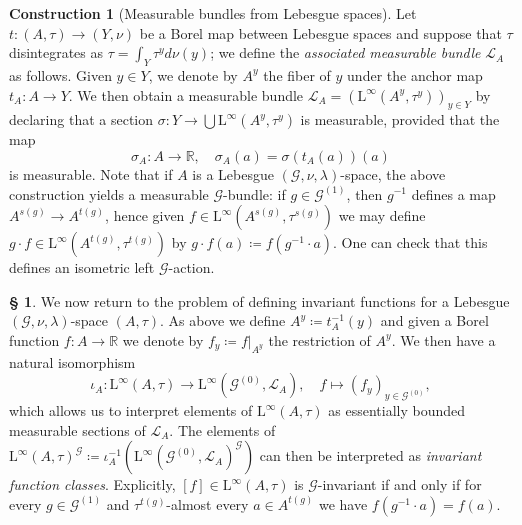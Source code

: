 \documentclass[11pt, oneside]{amsart}
\theoremstyle{definition}
\newtheorem{con}[lemma]{Construction}
\newtheorem{no}[lemma]{\S}
\theoremstyle{remark}
\theoremstyle{TheoremNum}
\newcommand{\Linf}{\mathrm{L}^{\infty}}
\newcommand{\cG}{\mathcal{G}}
\newcommand{\bR}{\mathbb{R}}
\newcommand{\cL}{\mathcal L}
\begin{document}
 \begin{con}[Measurable bundles from Lebesgue spaces]\label{LBundle}
 Let $t:(A, \tau)\to(Y,\nu)$ be a Borel map between Lebesgue spaces and suppose that $\tau$ disintegrates as $\tau=\int_Y\tau^y d\nu(y)$; we define the \emph{associated measurable bundle} $\cL_{A}$ as follows. 
Given $y \in Y$, we denote by $A^y$ the fiber of $y$ under the anchor map $t_A:A \to Y$. We then obtain a measurable bundle $\cL_A = (\Linf(A^y, \tau^y))_{y \in Y}$ by declaring that a section $\sigma: Y \to \bigcup \Linf(A^y, \tau^y)$ is measurable, provided that the map
\[
\sigma_A: A \to \bR, \quad \sigma_A(a) = \sigma(t_A(a))(a)
\] 
is measurable. Note that if $A$ is a Lebesgue $(\mathcal{G},\nu,\lambda)$-space, the above construction yields a measurable $\mathcal{G}$-bundle: if $g \in \cG^{(1)}$, then $g^{-1}$ defines a map $A^{s(g)} \to A^{t(g)}$, hence given $f \in \Linf(A^{s(g)}, \tau^{s(g)})$ we may define $g \cdot f \in  \Linf(A^{t(g)}, \tau^{t(g)})$ by $g \cdot f(a) \coloneqq  f(g^{-1} \cdot a)$. 
One can check that this defines an isometric left $\cG$-action.
\end{con}
\begin{no} We now return to the problem of defining invariant functions for a Lebesgue $(\cG, \nu, \lambda)$-space $(A, \tau)$. As above we define $A^y \coloneqq  t_A^{-1}(y)$ and given a Borel function $f: A \to \bR$ we denote by $f_y \coloneqq  f|_{A^y}$ the restriction of $A^y$. We then have a natural isomorphism
\begin{equation}\label{fy}
\iota_A: \Linf(A, \tau) \to \Linf(\cG^{(0)}, \cL_A), \quad f \mapsto (f_y)_{y \in \cG^{(0)}},
\end{equation}
which allows us to interpret elements of $\Linf(A, \tau)$ as essentially bounded measurable sections of $\cL_A$. The elements of $\Linf(A, \tau)^{\cG} \coloneqq \iota_A^{-1}(\Linf(\cG^{(0)}, \cL_A)^{\cG})$ can then be interpreted as \emph{invariant function classes}. Explicitly, $[f] \in \Linf(A, \tau)$ is $\cG$-invariant if and only if for every $g \in \cG^{(1)}$ and $\tau^{t(g)}$-almost every $a \in A^{t(g)}$ we have $f(g^{-1}\cdot a) = f(a)$. 
\end{no}
\end{document}
